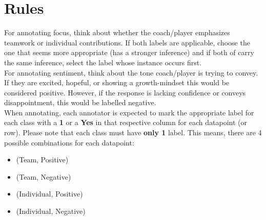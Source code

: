 \documentclass[titlepage]{article}
\begin{document}
\section{Rules}
For annotating focus, think about whether the coach/player emphasizes teamwork or individual contributions. If both labels are applicable,
choose the one that seems more appropriate (has a stronger inference) and if both of carry the same inference, select
the label whose instance occurs first. \\

For annotating sentiment, think about the tone coach/player is trying to convey. If they are excited, hopeful, or showing a 
growth-mindset this would be considered positive. However, if the response is lacking confidence or conveys disappointment, 
this would be labelled negative. \\

When annotating, each annotator is expected to mark the appropriate label for each class with a \textbf{1} or 
a \textbf{Yes} in that respective column for each datapoint (or row). Please note that each class must have 
\textbf{only 1} label. This means, there are 4 possible combinations for each datapoint:
\begin{itemize}
    \item (Team, Positive)
    \item (Team, Negative)
    \item (Individual, Positive)
    \item (Individual, Negative)
\end{itemize}
\end{document}
